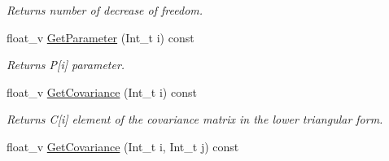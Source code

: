 \begin{DoxyCompactItemize}
\begin{DoxyCompactList}\small\item\em Returns number of decrease of freedom. \end{DoxyCompactList}\item 
float\+\_\+v \hyperlink{classKFParticleBaseSIMD_aedb30f3be0ee8f5da98feaabe9d3074e}{Get\+Parameter} (Int\+\_\+t i) const \hypertarget{classKFParticleBaseSIMD_aedb30f3be0ee8f5da98feaabe9d3074e}{}\label{classKFParticleBaseSIMD_aedb30f3be0ee8f5da98feaabe9d3074e}

\begin{DoxyCompactList}\small\item\em Returns P\mbox{[}i\mbox{]} parameter. \end{DoxyCompactList}\item 
float\+\_\+v \hyperlink{classKFParticleBaseSIMD_a4f7b481e281eb3b0bfc45cfb7db1065c}{Get\+Covariance} (Int\+\_\+t i) const \hypertarget{classKFParticleBaseSIMD_a4f7b481e281eb3b0bfc45cfb7db1065c}{}\label{classKFParticleBaseSIMD_a4f7b481e281eb3b0bfc45cfb7db1065c}

\begin{DoxyCompactList}\small\item\em Returns C\mbox{[}i\mbox{]} element of the covariance matrix in the lower triangular form. \end{DoxyCompactList}\item 
float\+\_\+v \hyperlink{classKFParticleBaseSIMD_aba80c9e268af07473fcf0aa75c804507}{Get\+Covariance} (Int\+\_\+t i, Int\+\_\+t j) const \hypertarget{classKFParticleBaseSIMD_aba80c9e268af07473fcf0aa75c804507}{}\label{classKFParticleBaseSIMD_aba80c9e268af07473fcf0aa75c804507}


\end{DoxyCompactItemize}
